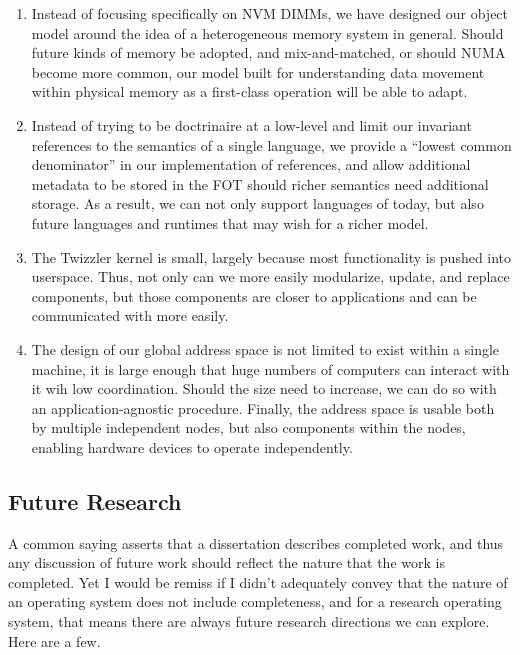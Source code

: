 \begin{enumerate}
    \item Instead of focusing specifically on NVM DIMMs, we have designed our object model around the idea of a
          heterogeneous memory system in general. Should future kinds of memory be adopted, and mix-and-matched, or should
          NUMA become more common, our model built for understanding data movement within physical memory as a first-class
          operation will be able to adapt.
    \item Instead of trying to be doctrinaire at a low-level and limit our invariant references to the semantics of a
          single language, we provide a ``lowest common denominator'' in our implementation of references, and allow
          additional metadata to be stored in the FOT should richer semantics need additional storage. As a result, we can not
          only support languages of today, but also future languages and runtimes that may wish for a richer model.
    \item The Twizzler kernel is small, largely because most functionality is pushed into userspace. Thus, not only can
          we more easily modularize, update, and replace components, but those components are closer to applications and can
          be communicated with more easily.
    \item The design of our global address space is not limited to exist within a single machine, it is large enough
          that huge numbers of computers can interact with it wih low coordination. Should the size need to increase, we can
          do so with an application-agnostic procedure. Finally, the address space is usable both by multiple
          independent nodes, but also components within the nodes, enabling hardware devices to operate independently.
\end{enumerate}

\subsection{Future Research}


A common saying asserts that a dissertation describes completed work, and thus any discussion of future work should reflect
the nature that the work is completed. Yet I would be remiss if I didn't adequately convey that the nature of an
operating system does not include completeness, and for a research operating system, that means there are always future
research directions we can explore. Here are a few.

